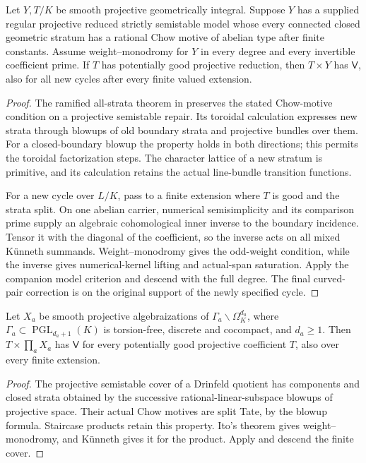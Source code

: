\begin{theorem}\label{thm:abelian-strata}
Let $Y,T/K$ be smooth projective geometrically integral. Suppose
$Y$ has a supplied regular projective reduced strictly
semistable model whose every connected closed geometric stratum
has a rational Chow motive of abelian type after finite constants.
Assume weight--monodromy for $Y$ in every degree and every
invertible coefficient prime. If $T$ has potentially good projective
reduction, then $T\times Y$ has $\mathsf V$, also for all new
cycles after every finite valued extension.
\end{theorem}

\begin{proof}
The ramified all-strata theorem in \cite{InternalUniformization}
preserves the stated Chow-motive condition on a projective
semistable repair. Its toroidal calculation expresses new strata
through blowups of old boundary strata and projective bundles over
them. For a closed-boundary blowup the property holds in both
directions; this permits the toroidal factorization steps. The
character lattice of a new stratum is primitive, and its calculation
retains the actual line-bundle transition functions.

For a new cycle over $L/K$, pass to a finite extension where $T$
is good and the strata split. On one abelian carrier, numerical
semisimplicity and its comparison prime supply an algebraic
cohomological inner inverse to the boundary incidence. Tensor it
with the diagonal of the coefficient, so the inverse acts on all
mixed K\"unneth summands. Weight--monodromy gives the odd-weight
condition, while the inverse gives numerical-kernel lifting and
actual-span saturation. Apply the companion model criterion and
descend with the full degree. The final curved-pair correction is
on the original support of the newly specified cycle.
\end{proof}

\begin{corollary}\label{cor:drinfeld}
Let $X_a$ be smooth projective algebraizations of
$\Gamma_a\backslash\Omega_K^{d_a}$, where
$\Gamma_a\subset\operatorname{PGL}_{d_a+1}(K)$ is torsion-free,
discrete and cocompact, and $d_a\geq1$. Then
$T\times\prod_aX_a$ has $\mathsf V$ for every potentially good
projective coefficient $T$, also over every finite extension.
\end{corollary}

\begin{proof}
The projective semistable cover of a Drinfeld quotient has
components and closed strata obtained by the successive
rational-linear-subspace blowups of projective space. Their actual
Chow motives are split Tate, by the blowup formula. Staircase
products retain this property. Ito's theorem \cite{Ito} gives
weight--monodromy, and K\"unneth gives it for the product. Apply
 and descend the finite cover.
\end{proof}

